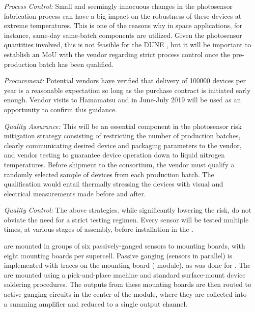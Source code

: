 {\textit{Process Control:}} Small and seemingly innocuous
changes in the photosensor fabrication process can have a big impact on the robustness of these devices at extreme temperatures. This is one of the reasons why in space applications, for instance, same-day same-batch components are utilized. Given the photosensor quantities involved, this is not feasible for the DUNE , but
it will be important to establish an MoU with the vendor regarding 
strict process control once the pre-production batch has been qualified.

{\textit{Procurement:}} Potential vendors have verified that delivery of \num{100000} devices per year is a reasonable expectation so long as the purchase contract is initiated early enough.  Vendor visits to Hamamatsu and  in June-July 2019 will be used as an opportunity to confirm this guidance.


{\textit{Quality Assurance:}} This will be an essential component in the photosensor risk mitigation strategy consisting of restricting the number of production batches, clearly communicating desired device and packaging parameters to the vendor, and vendor testing to
guarantee device operation down to liquid nitrogen temperatures.
Before shipment to the consortium, the vendor 
must qualify a randomly selected sample of devices from each production batch. The qualification would entail thermally stressing the devices 
with visual and electrical measurements made before and after. 

{\textit{Quality Control:}} The above strategies, while significantly lowering the risk, do not obviate the need for a strict testing regimen. Every sensor will be tested multiple times, at various stages of assembly, before installation in the .

 are mounted in groups of six passively-ganged sensors to mounting boards, with eight mounting boards per supercell.  Passive ganging (sensors in parallel) is implemented with traces on the  mounting board ( module), 
as was done for .  The  are mounted using a pick-and-place machine and standard surface-mount device soldering procedures. The outputs from these mounting boards are then routed to active ganging circuits in the center of the  module, where they are collected into a summing amplifier and reduced to a single output channel.

